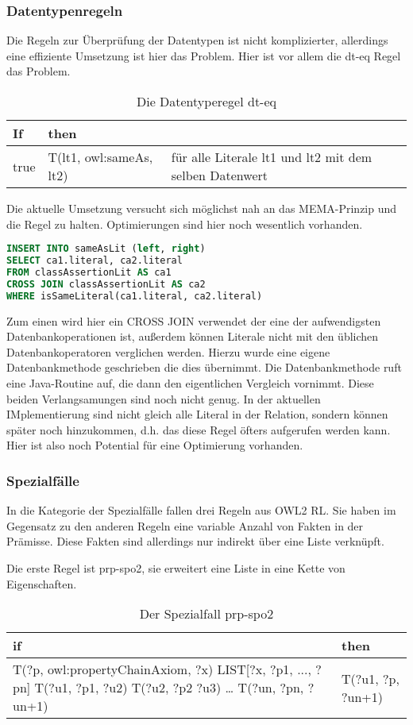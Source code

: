\subsubsection{Datentypenregeln}
Die Regeln zur Überprüfung der Datentypen ist nicht komplizierter, allerdings eine effiziente Umsetzung ist hier das Problem. Hier ist vor allem die dt-eq Regel das Problem.
\begin{table}
\begin{tabular}{l|l|l}
If & then & \\ \hline
true & T(lt1, owl:sameAs, lt2) & für alle Literale lt1 und lt2 mit dem selben Datenwert
\end{tabular}
\caption{Die Datentyperegel dt-eq}
\label{rule-dt-eq}
\end{table}


Die aktuelle Umsetzung versucht sich möglichst nah an das MEMA-Prinzip und die Regel zu halten. Optimierungen sind hier noch wesentlich vorhanden.

\begin{lstlisting}[language=SQL]
INSERT INTO sameAsLit (left, right)
SELECT ca1.literal, ca2.literal
FROM classAssertionLit AS ca1
CROSS JOIN classAssertionLit AS ca2
WHERE isSameLiteral(ca1.literal, ca2.literal)
\end{lstlisting}

Zum einen wird hier ein CROSS JOIN verwendet der eine der aufwendigsten Datenbankoperationen ist, außerdem können Literale nicht mit den üblichen Datenbankoperatoren verglichen werden. Hierzu wurde eine eigene Datenbankmethode geschrieben die dies übernimmt. Die Datenbankmethode ruft eine Java-Routine auf, die dann den eigentlichen Vergleich vornimmt. Diese beiden Verlangsamungen sind noch nicht genug. In der aktuellen IMplementierung sind nicht gleich alle Literal in der Relation, sondern können später noch hinzukommen, d.h. das diese Regel öfters aufgerufen werden kann. Hier ist also noch Potential für eine Optimierung vorhanden.


\subsubsection{Spezialfälle} 
In die Kategorie der Spezialfälle fallen drei Regeln aus OWL2 RL. Sie haben im Gegensatz zu den anderen Regeln eine variable Anzahl von Fakten in der Prämisse. Diese Fakten sind allerdings nur indirekt über eine Liste verknüpft.

Die erste Regel ist prp-spo2, sie erweitert eine Liste in eine Kette von Eigenschaften.
\begin{table}
\begin{tabular}{l|l}
if & then \\ \hline
T(?p, owl:propertyChainAxiom, ?x)
LIST[?x, ?p1, ..., ?pn]
T(?u1, ?p1, ?u2)
T(?u2, ?p2 ?u3)
\ldots
T(?un, ?pn, ?un+1) & T(?u1, ?p, ?un+1)
\end{tabular}
\caption{Der Spezialfall prp-spo2}
\label{rule-prp-spo2}
\end{table}

